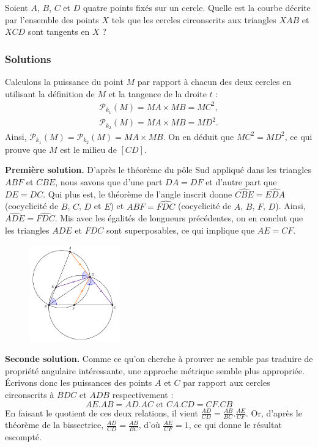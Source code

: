 \begin{exo}
Soient $A$, $B$, $C$ et $D$ quatre points fixés sur un cercle. Quelle est la courbe décrite par l'ensemble des points $X$ tels que les cercles circonscrits aux triangles $XAB$ et $XCD$ sont tangents en $X$ ?
\end{exo}


\subsubsection{Solutions}


\begin{sol}
Calculons la puissance du point $M$ par rapport à chacun des deux cercles en utilisant la définition de $M$ et la tangence de la droite $t$ :
\begin{gather*}
    \mathcal{P}_{k_1}(M) = MA \times MB = MC^2,  \\
    \mathcal{P}_{k_2}(M) = MA \times MB = MD^2.
\end{gather*}
Ainsi, $\mathcal{P}_{k_1}(M) = \mathcal{P}_{k_2}(M) = MA \times MB$. On en déduit que $MC^2 = MD^2$, ce qui prouve que $M$ est le milieu de $[CD]$.
\end{sol}


\begin{sol}
\textbf{Première solution.} D'après le théorème du pôle Sud appliqué dans les triangles $ABF$ et $CBE$, nous savons que d'une part $DA=DF$ et d'autre part que $DE=DC$. Qui plus est, le théorème de l'angle inscrit donne $\widehat{CBE}=\widehat{EDA}$ (cocyclicité de $B$, $C$, $D$ et $E$) et $\widehat{ABF}=\widehat{FDC}$ (cocyclicité de $A$, $B$, $F$, $D$). Ainsi, $\widehat{ADE}=\widehat{FDC}$. Mis avec les égalités de longueurs précédentes, on en conclut que les triangles $ADE$ et $FDC$ sont superposables, ce qui implique que $AE=CF$.

\begin{figure}[!h]
\centerline{\includegraphics[width=0.35\textwidth]{pied_bissectrice}}
\end{figure}

\textbf{Seconde solution.} Comme ce qu'on cherche à prouver ne semble pas traduire de propriété angulaire intéressante, une approche métrique semble plus appropriée. Écrivons donc les puissances des points $A$ et $C$ par rapport aux cercles circonscrits à $BDC$ et $ADB$ respectivement :
\[ AE.AB = AD.AC \text{\ \ \ et\ \ \ } CA.CD = CF.CB \]
En faisant le quotient de ces deux relations, il vient $\frac{AD}{CD} = \frac{AB}{BC}.\frac{AE}{CF}$. Or, d'après le théorème de la bissectrice, $\frac{AD}{CD} = \frac{AB}{BC}$, d'où $\frac{AE}{CF}=1$, ce qui donne le résultat escompté.
\end{sol}



